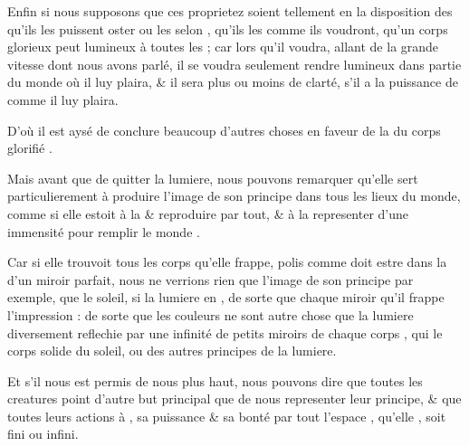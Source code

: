 \documentclass[11pt,a4paper]{article}
\begin{document}
Enfin si nous supposons que ces proprietez soient tellement en la disposition des  qu'ils les puissent oster ou les  selon \struck{\ill{}} , qu'ils les   comme ils voudront,  qu'un corps glorieux peut  lumineux à toutes les  ; car lors qu'il \struck{\ill{}} voudra, allant de la grande vitesse dont nous avons parlé, il se voudra seulement rendre lumineux dans  partie du monde où il luy plaira, \& il sera   \struck{\ill{}} plus ou moins de clarté, s'il a la puissance de  \struck{\ill{}} comme il luy plaira.

D'où il est aysé de conclure beaucoup d'autres choses en faveur de la  du corps glorifié  .

Mais avant que de quitter la lumiere, nous pouvons remarquer qu'elle sert particulierement à produire l'image de son principe dans tous les lieux du monde, comme si elle estoit à la  \& reproduire par tout, \& à la representer d'une immensité pour remplir  le monde .

Car si elle trouvoit tous les corps qu'elle frappe, polis comme \struck{\ill{}} doit estre dans la  d'un miroir parfait, nous ne verrions rien que l'image de son principe par exemple, que le soleil, \struck{\ill{}} si la lumiere en , de sorte que chaque miroir qu'il frappe \struck{\ill{}}   \ill{} \struck{\ill{}} l'impression : de sorte que les couleurs ne sont autre chose que la lumiere diversement reflechie par une infinité de petits miroirs de chaque corps , qui    le corps solide du soleil, ou des autres principes de la lumiere.

Et s'il nous est permis de nous  plus haut, nous pouvons dire que toutes les creatures  point d'autre but principal que de nous representer leur principe, \& que toutes leurs actions  à   , sa puissance \& sa bonté  par tout l'espace , qu'elle , soit fini ou infini.
\end{document}
